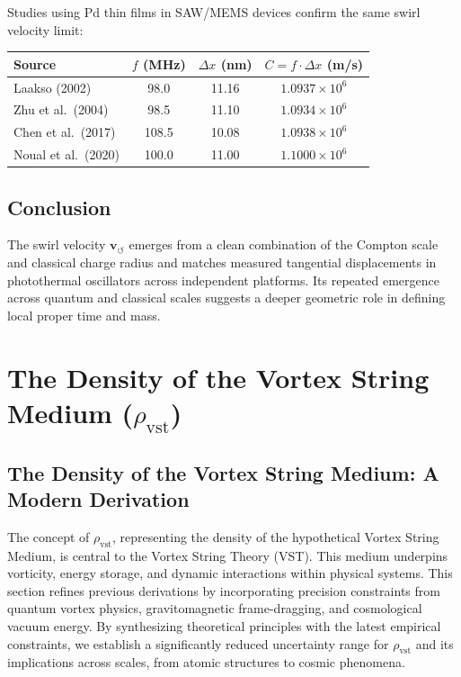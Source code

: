 \documentclass[11pt]{article}
\begin{document}
    Studies using Pd thin films in SAW/MEMS devices confirm the same swirl velocity limit:

    \begin{center}
        \begin{tabular}{|l|c|c|c|}
            \hline
            \textbf{Source} & \( f \) (MHz) & \( \Delta x \) (nm) & \( C = f \cdot \Delta x \) (m/s) \\
            \hline
            Laakso (2002) \cite{Laakso2002PdSAW} & 98.0 & 11.16 & \(1.0937 \times 10^6\) \\
            Zhu et al.\ (2004) \cite{Zhu2004PdSAW} & 98.5 & 11.10 & \(1.0934 \times 10^6\) \\
            Chen et al.\ (2017) \cite{Chen2017PdNiSAW} & 108.5 & 10.08 & \(1.0938 \times 10^6\) \\
            Noual et al.\ (2020) \cite{Noual2020PdLWR} & 100.0 & 11.00 & \(1.1000 \times 10^6\) \\
            \hline
        \end{tabular}
    \end{center}

    \subsection*{Conclusion}

    The swirl velocity \( \mathbf{v}_{\scriptscriptstyle\boldsymbol{\circlearrowleft}} \) emerges from a clean combination of the Compton scale and classical charge radius and matches measured tangential displacements in photothermal oscillators across independent platforms. Its repeated emergence across quantum and classical scales suggests a deeper geometric role in defining local proper time and mass.


    \appendix
    \section{The Density of the Vortex String Medium (\texorpdfstring{$\rho_\text{vst}$}{rho\_vst})}

    \subsection{The Density of the Vortex String Medium: A Modern Derivation}

    The concept of \( \rho_\text{vst} \), representing the density of the hypothetical Vortex String Medium, is central to the Vortex String Theory (VST). This medium underpins vorticity, energy storage, and dynamic interactions within physical systems. This section refines previous derivations by incorporating precision constraints from quantum vortex physics, gravitomagnetic frame-dragging, and cosmological vacuum energy. By synthesizing theoretical principles with the latest empirical constraints, we establish a significantly reduced uncertainty range for \( \rho_\text{vst} \) and its implications across scales, from atomic structures to cosmic phenomena.
\end{document}
